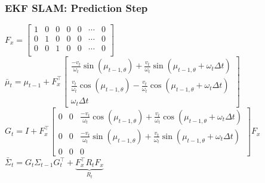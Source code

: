 \begin{frame}
    \frametitle{EKF SLAM: Prediction Step}

    \begin{algorithmic}[1]
        \State $F_x = \begin{bmatrix}
        1 & 0 & 0 & 0 & 0 & \cdots & 0 \\
        0 & 1 & 0 & 0 & 0 & \cdots & 0 \\
        0 & 0 & 1 & 0 & 0 & \cdots & 0 \\
        \end{bmatrix}$
        \vspace{1em}
        \State $\bar{\mu}_t = \mu_{t-1} + F_x^{\top}
        \begin{bmatrix}
        \frac{-v_t}{\omega_t} \sin(\mu_{t-1,\theta}) + \frac{v_t}{\omega_t} \sin(\mu_{t-1,\theta} + \omega_t \Delta t) \\
        \frac{v_t}{\omega_t} \cos(\mu_{t-1,\theta}) - \frac{v_t}{\omega_t} \cos(\mu_{t-1,\theta} + \omega_t \Delta t) \\
        \omega_t \Delta t
        \end{bmatrix}$
        \vspace{1em}
        \State $G_t = I + F_x^{\top}
        \begin{bmatrix}
        0 & 0 & \frac{-v_t}{\omega_t} \cos(\mu_{t-1,\theta}) + \frac{v_t}{\omega_t} \cos(\mu_{t-1,\theta} + \omega_t \Delta t) \\
        0 & 0 & \frac{-v_t}{\omega_t} \sin(\mu_{t-1,\theta}) + \frac{v_t}{\omega_t} \sin(\mu_{t-1,\theta} + \omega_t \Delta t) \\
        0 & 0 & 0
        \end{bmatrix} F_x$
        \vspace{1em}
        \State $\bar{\Sigma}_t = G_t \Sigma_{t-1} G_t^{\top} + \underbrace{F_x^{\top} R_t F_x}_{R_t}$
        \EndProcedure
    \end{algorithmic}
    
\end{frame}


